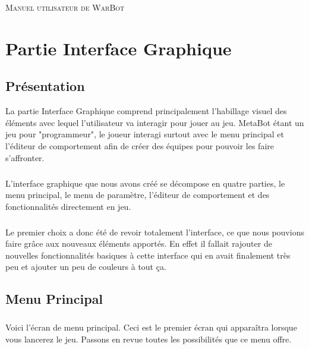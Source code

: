 \documentclass{report}
\begin{document}
\begin{titlepage}
  \begin{sffamily}
  \begin{center}

    \huge \textsc{Manuel utilisateur de WarBot}\\[5cm]
  \end{center}

  \end{sffamily}
\end{titlepage}
  
\tableofcontents
\newpage
\chapter{Partie Interface Graphique}
\section{Présentation}
La partie Interface Graphique comprend principalement l'habillage visuel des éléments avec lequel l'utilisateur va interagir pour jouer au jeu. MetaBot étant un jeu pour "programmeur", le joueur interagi surtout avec le menu principal et l'éditeur de comportement afin de créer des équipes pour pouvoir les faire s'affronter.
\paragraph{}
L'interface graphique que nous avons créé se décompose en quatre parties, le menu principal, le menu de paramètre, l'éditeur de comportement et des fonctionnalités directement en jeu.
\paragraph{}
Le premier choix a donc été de revoir totalement l'interface, ce que nous pouvions faire grâce aux nouveaux éléments apportés. En effet il fallait rajouter de nouvelles fonctionnalités basiques à cette interface qui en avait finalement très peu et ajouter un peu de couleurs à tout ça.


\section{Menu Principal}
\paragraph{}
Voici l’écran de menu principal. Ceci est le premier écran qui apparaîtra lorsque vous lancerez le jeu.
Passons en revue toutes les possibilités que ce menu offre.
\end{document}
